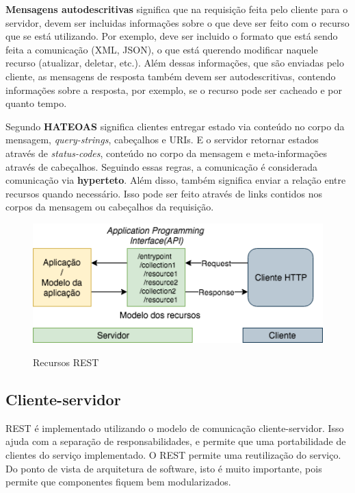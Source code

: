 \textbf{Mensagens autodescritivas} significa que na requisição feita pelo cliente para
o servidor, devem ser incluidas informações sobre o que deve ser feito com o recurso
que se está utilizando. Por exemplo, deve ser incluido o formato que está sendo feita a
comunicação (XML, JSON), o que está querendo modificar naquele recurso (atualizar, deletar, etc.).
Além dessas informações, que são enviadas pelo cliente, as mensagens de resposta também devem 
ser autodescritivas, contendo informações sobre a resposta, por exemplo, se o recurso pode ser
cacheado e por quanto tempo.

Segundo \cite{todd} \textbf{HATEOAS} significa clientes entregar estado via conteúdo no corpo
da mensagem, \textit{query-strings}, cabeçalhos e URIs. E o servidor retornar estados
através de \textit{status-codes}, conteúdo no corpo da mensagem e meta-informações através
de cabeçalhos. Seguindo essas regras, a comunicação é considerada comunicação via \textbf{hyperteto}.
Além disso, também significa enviar a relação entre recursos quando necessário. Isso pode
ser feito através de links contidos nos corpos da mensagem ou cabeçalhos da requisição.

\begin{figure}[!htb]
  \centering
  \caption{Recursos REST}
  \includegraphics[width=1\textwidth]{./dados/figuras/rest-2.png}
  \label{fig:rest2}
\end{figure}

\subsection{Cliente-servidor}

REST é implementado utilizando o modelo de comunicação cliente-servidor. 
Isso ajuda com a separação de responsabilidades, e permite que uma portabilidade 
de clientes do serviço implementado. O REST permite uma reutilização do serviço. 
Do ponto de vista de arquitetura de software, isto é muito importante, pois permite 
que componentes fiquem bem modularizados.

